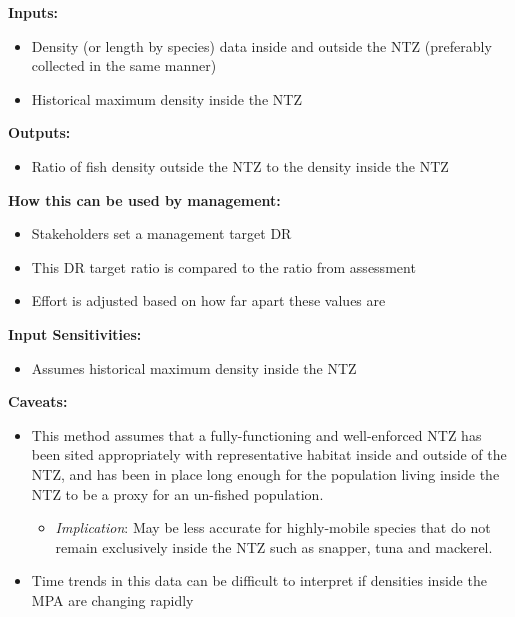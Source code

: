 \documentclass[]{book}
\providecommand{\tightlist}{%
  \setlength{\itemsep}{0pt}\setlength{\parskip}{0pt}}
\begin{document}
\textbf{Inputs: }

\begin{itemize}
\item
  Density (or length by species) data inside and outside the NTZ
  (preferably collected in the same manner)
\item
  Historical maximum density inside the NTZ
\end{itemize}

\textbf{Outputs: }

\begin{itemize}
\tightlist
\item
  Ratio of fish density outside the NTZ to the density inside the NTZ
\end{itemize}

\textbf{How this can be used by management:}

\begin{itemize}
\item
  Stakeholders set a management target DR
\item
  This DR target ratio is compared to the ratio from assessment
\item
  Effort is adjusted based on how far apart these values are
\end{itemize}

\textbf{Input Sensitivities: }

\begin{itemize}
\tightlist
\item
  Assumes historical maximum density inside the NTZ
\end{itemize}

\textbf{Caveats:}

\begin{itemize}
\item
  This method assumes that a fully-functioning and well-enforced NTZ has
  been sited appropriately with representative habitat inside and
  outside of the NTZ, and has been in place long enough for the
  population living inside the NTZ to be a proxy for an un-fished
  population.

  \begin{itemize}
  \tightlist
  \item
    \emph{Implication}: May be less accurate for highly-mobile species
    that do not remain exclusively inside the NTZ such as snapper, tuna
    and mackerel.
  \end{itemize}
\item
  Time trends in this data can be difficult to interpret if densities
  inside the MPA are changing rapidly
\end{itemize}
\end{document}
